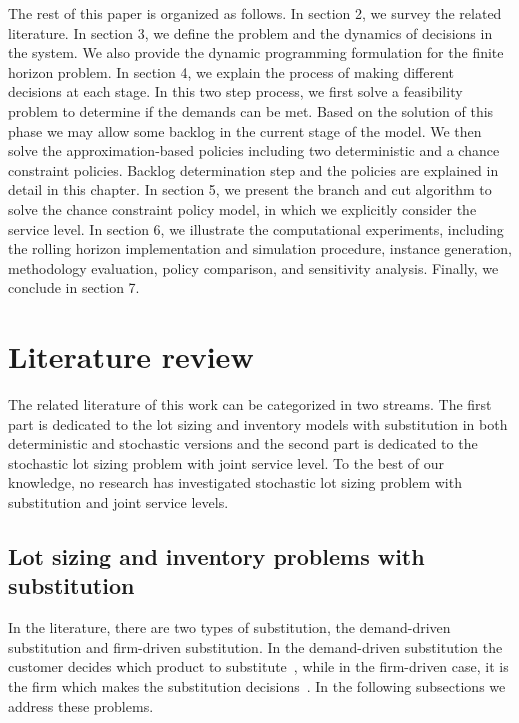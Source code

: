 \documentclass[10pt]{article}
\begin{document}
The rest of this paper is organized as follows. In section 2, we survey the related literature. In section 3, we define the problem and the dynamics of decisions in the system. We also provide the dynamic programming formulation for the finite horizon problem. In section 4, we explain the process of making different decisions at each stage. In this two step process, we first solve a feasibility problem to determine if the demands can be met. Based on the solution of this phase we may allow some backlog in the current stage of the model. We then solve the approximation-based policies including two deterministic and a chance constraint policies. Backlog determination step and the policies are explained in detail in this chapter. In section 5, we present the branch and cut algorithm to solve the chance constraint policy model, in which we explicitly consider the service level. In section 6, we illustrate the computational experiments, including the rolling horizon implementation and simulation procedure, instance generation, methodology evaluation, policy comparison, and sensitivity analysis. Finally, we conclude in section 7.

\section{Literature review}
\label{sec:litrev}
The related literature of this work can be categorized in two streams. The first part is dedicated to the lot sizing and inventory models with substitution in both deterministic and stochastic versions and the second part is dedicated to the stochastic lot sizing problem with joint service level. To the best of our knowledge, no research has investigated stochastic lot sizing problem with substitution and joint service levels.

\subsection{Lot sizing and inventory problems with substitution}
In the literature, there are two types of substitution, the demand-driven substitution and firm-driven substitution. In the demand-driven substitution the customer decides which product to substitute~\cite{zeppetella2017optimal}, while in the firm-driven case, it is the firm which makes the substitution decisions~\cite{rao2004multi}. In the following subsections we address these problems. 
\end{document}
